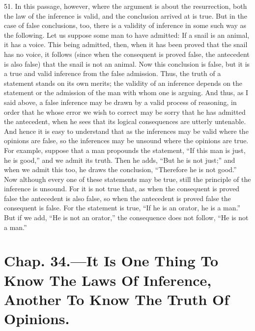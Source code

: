 51. In this passage, however, where the argument is about the
resurrection, both the law of the inference is valid, and the
conclusion arrived at is true. But in the case of false conclusions,
too, there is a validity of inference in some such way as the
following. Let us suppose some man to have admitted: If a snail is an
animal, it has a voice. This being admitted, then, when it has been
proved that the snail has no voice, it follows (since when the
consequent is proved false, the antecedent is also false) that the
snail is not an animal. Now this conclusion is false, but it is a true
and valid inference from the false admission. Thus, the truth of a
statement stands on its own merits; the validity of an inference
depends on the statement or the admission of the man with whom one is
arguing. And thus, as I said above, a false inference may be drawn by
a valid process of reasoning, in order that he whose error we wish to
correct may be sorry that he has admitted the antecedent, when he sees
that its logical consequences are utterly untenable. And hence it is
easy to understand that as the inferences may be valid where the
opinions are false, so the inferences may be unsound where the
opinions are true. For example, suppose that a man propounds the
statement, ``If this man is just, he is good,'' and we admit its
truth. Then he adds, ``But he is not just;'' and when we admit this
too, he draws the conclusion, ``Therefore he is not good.'' Now
although every one of these  statements may be true, still
the principle of the inference is unsound. For it is not true that, as
when the consequent is proved false the antecedent is also false, so
when the antecedent is proved false the consequent is false. For the
statement is true, ``If he is an orator, he is a man.'' But if we add,
``He is not an orator,'' the consequence does not follow, ``He is not
a man.''

\section*{Chap. 34.\smaller---It Is One Thing To Know The Laws Of
Inference, Another To Know The Truth Of Opinions.}

